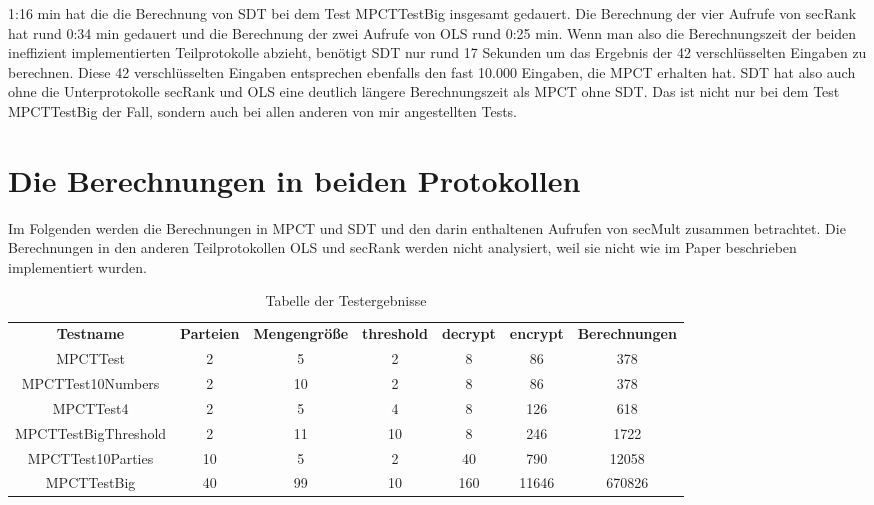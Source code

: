 1:16 min hat die die Berechnung von SDT bei dem Test MPCTTestBig insgesamt gedauert. Die Berechnung der vier Aufrufe von secRank hat rund 0:34 min gedauert und die Berechnung der zwei Aufrufe von OLS rund 0:25 min. Wenn man also die Berechnungszeit der beiden ineffizient implementierten Teilprotokolle abzieht, benötigt SDT nur rund 17 Sekunden um das Ergebnis der 42 verschlüsselten Eingaben zu berechnen. Diese 42 verschlüsselten Eingaben entsprechen ebenfalls den fast 10.000 Eingaben, die MPCT erhalten hat. SDT hat also auch ohne die Unterprotokolle secRank und OLS eine deutlich längere Berechnungszeit als MPCT ohne SDT. Das ist nicht nur bei dem Test MPCTTestBig der Fall, sondern auch bei allen anderen von mir angestellten Tests.

\section{Die Berechnungen in beiden Protokollen}
Im Folgenden werden die Berechnungen in MPCT und SDT und den darin enthaltenen Aufrufen von secMult zusammen betrachtet. 
Die Berechnungen in den anderen Teilprotokollen OLS und secRank werden nicht analysiert, weil sie nicht wie im Paper \cite{Doettling2021} beschrieben implementiert wurden.

   \begin{table}[!h]
     \centering
     \begin{tabular}{c|ccc|ccc}
       \textbf{Testname} & \textbf{Parteien} & \textbf{Mengengröße} & \textbf{threshold} & \textbf{decrypt} &\textbf{encrypt} & \textbf{Berechnungen}\\
       MPCTTest & 2 & 5 & 2 & 8 & 86 & 378\\
       MPCTTest10Numbers & 2 & 10 & 2 & 8 & 86 & 378\\
       MPCTTest4 & 2 & 5 & 4 & 8 & 126 & 618\\
       MPCTTestBigThreshold & 2 & 11 & 10 & 8 & 246 & 1722\\
       MPCTTest10Parties & 10 & 5 & 2 & 40 & 790 & 12058\\
       MPCTTestBig &40 & 99 & 10 & 160 & 11646 & 670826\\
     \end{tabular}

     \caption{Tabelle der Testergebnisse}
     \label{tbl:results}

   \end{table}

